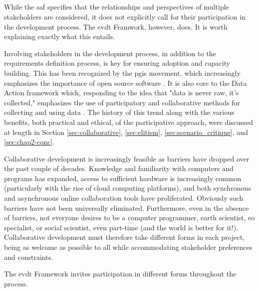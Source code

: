 \subsection{} \label{sec:evdt-collab}

While the \ac{saf} specifies that the relationships and perspectives of multiple stakeholders are considered, it does not explicitly call for their participation in the development process. The \ac{evdt} Framwork, however, does. It is worth explaining exactly what this entails.

Involving stakeholders in the development process, in addition to the requirements definition process, is key for ensuring adoption and capacity building. This has been recognized by the \ac{pgis} movement, which increasingly emphasizes the importance of open source software \cite{williamsonTheirworkDevelopmentSustainable2011, dodgeMappingModesMethods2011}. It is also core to the Data Action framework which, responding to the idea that "data is never raw, it's collected," emphasizes the use of participatory and collaborative methods for collecting and using data \cite{williamsDataActionUsing2020}. The history of this trend along with the various benefits, both practical and ethical, of the participative approach, were discussed at length in Section \ref{sec:collaborative}, \ref{sec:elitism}, \ref{sec:scenario_critique}, and \ref{sec:chap2-conc}.

Collaborative development is increasingly feasible as barriers have dropped over the past couple of decades. Knowledge and familiarity with computers and programs has expanded, access to sufficient hardware is increasingly common (particularly with the rise of cloud computing platforms), and both synchronous and asynchronous online collaboration tools have proliferated. Obviously such barriers have not been universally eliminated. Furthermore, even in the absence of barriers, not everyone desires to be a computer programmer, earth scientist, \ac{eo} specialist, or social scientist, even part-time (and the world is better for it!). Collaborative development must therefore take different forms in each project, being as welcome as possible to all while accommodating stakeholder preferences and constraints.

The \ac{evdt} Framework invites participation in different forms throughout the process.

